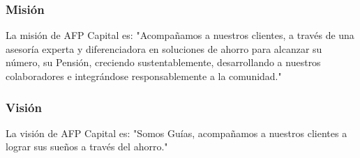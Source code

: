 \subsubsection{Misión}
La misión de AFP Capital es: "Acompañamos a nuestros clientes, a través de una asesoría experta y diferenciadora en soluciones de ahorro para alcanzar su número, su Pensión, creciendo sustentablemente, desarrollando a nuestros colaboradores e integrándose responsablemente a la comunidad." \cite{afpcapital} 

\subsubsection{Visión}
La visión de AFP Capital es: "Somos Guías, acompañamos a nuestros clientes a lograr sus sueños a través del ahorro." \cite{afpcapital}